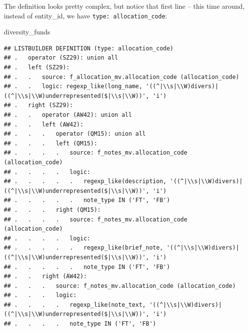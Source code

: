 \documentclass[]{book}
\newenvironment{Shaded}{\begin{snugshade}}{\end{snugshade}}
\newcommand{\NormalTok}[1]{#1}
\begin{document}
The definition looks pretty complex, but notice that first line -- this time around, instead of entity\_id, we have \texttt{type:\ allocation\_code}:

\begin{Shaded}
\begin{Highlighting}[]
\NormalTok{diversity_funds}
\end{Highlighting}
\end{Shaded}

\begin{verbatim}
## LISTBUILDER DEFINITION (type: allocation_code)
## .   operator (SZ29): union all
## .   left (SZ29): 
## .   .   source: f_allocation_mv.allocation_code (allocation_code)
## .   .   logic: regexp_like(long_name, '((^|\\s|\\W)divers)|((^|\\s|\\W)underrepresented($|\\s|\\W))', 'i')
## .   right (SZ29): 
## .   .   operator (AW42): union all
## .   .   left (AW42): 
## .   .   .   operator (QM15): union all
## .   .   .   left (QM15): 
## .   .   .   .   source: f_notes_mv.allocation_code (allocation_code)
## .   .   .   .   logic: 
## .   .   .   .   .   regexp_like(description, '((^|\\s|\\W)divers)|((^|\\s|\\W)underrepresented($|\\s|\\W))', 'i')
## .   .   .   .   .   note_type IN ('FT', 'FB')
## .   .   .   right (QM15): 
## .   .   .   .   source: f_notes_mv.allocation_code (allocation_code)
## .   .   .   .   logic: 
## .   .   .   .   .   regexp_like(brief_note, '((^|\\s|\\W)divers)|((^|\\s|\\W)underrepresented($|\\s|\\W))', 'i')
## .   .   .   .   .   note_type IN ('FT', 'FB')
## .   .   right (AW42): 
## .   .   .   source: f_notes_mv.allocation_code (allocation_code)
## .   .   .   logic: 
## .   .   .   .   regexp_like(note_text, '((^|\\s|\\W)divers)|((^|\\s|\\W)underrepresented($|\\s|\\W))', 'i')
## .   .   .   .   note_type IN ('FT', 'FB')
\end{verbatim}
\end{document}
